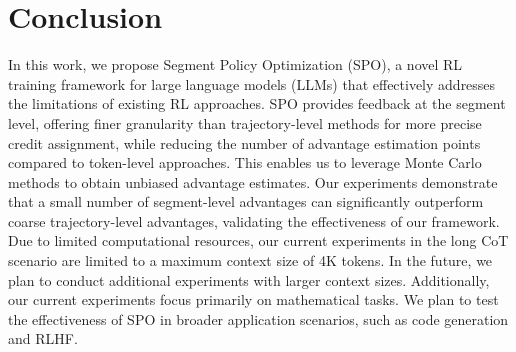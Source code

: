 \vspace{-0.2cm}
\section{Conclusion}
\label{sec:conclusion}
\vspace{-0.2cm}

In this work, we propose Segment Policy Optimization (SPO), a novel RL training framework for large language models (LLMs) that effectively addresses the limitations of existing RL approaches. SPO provides feedback at the segment level, offering finer granularity than trajectory-level methods for more precise credit assignment, while reducing the number of advantage estimation points compared to token-level approaches. This enables us to leverage Monte Carlo methods to obtain unbiased advantage estimates. Our experiments demonstrate that a small number of segment-level advantages can significantly outperform coarse trajectory-level advantages, validating the effectiveness of our framework. Due to limited computational resources, our current experiments in the long CoT scenario are limited to a maximum context size of 4K tokens. In the future, we plan to conduct additional experiments with larger context sizes. Additionally, our current experiments focus primarily on mathematical tasks. We plan to test the effectiveness of SPO in broader application scenarios, such as code generation and RLHF.

